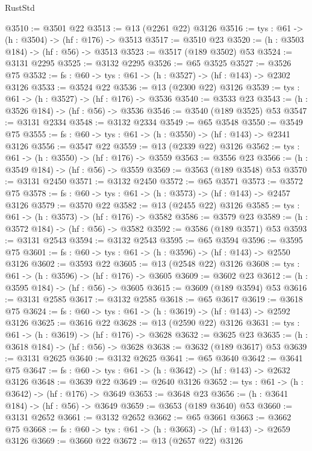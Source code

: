 \begin{lexlean}{RustStd}
\begin{coremodule}
@3510 := @3501 @22
@3513 := @13 (@2261 @22) @3126
@3516 := {tys : @61} -> (h : @3504) -> (hf : @176) -> @3513
@3517 := @3510 @23
@3520 := (h : @3503 @184) -> (hf : @56) -> @3513
@3523 := @3517 (@189 @3502) @53
@3524 := @3131 @2295
@3525 := @3132 @2295
@3526 := @65 @3525
@3527 := @3526 @75
@3532 := {fs : @60} -> {tys : @61} -> (h : @3527) -> (hf : @143) -> @2302 @3126
@3533 := @3524 @22
@3536 := @13 (@2300 @22) @3126
@3539 := {tys : @61} -> (h : @3527) -> (hf : @176) -> @3536
@3540 := @3533 @23
@3543 := (h : @3526 @184) -> (hf : @56) -> @3536
@3546 := @3540 (@189 @3525) @53
@3547 := @3131 @2334
@3548 := @3132 @2334
@3549 := @65 @3548
@3550 := @3549 @75
@3555 := {fs : @60} -> {tys : @61} -> (h : @3550) -> (hf : @143) -> @2341 @3126
@3556 := @3547 @22
@3559 := @13 (@2339 @22) @3126
@3562 := {tys : @61} -> (h : @3550) -> (hf : @176) -> @3559
@3563 := @3556 @23
@3566 := (h : @3549 @184) -> (hf : @56) -> @3559
@3569 := @3563 (@189 @3548) @53
@3570 := @3131 @2450
@3571 := @3132 @2450
@3572 := @65 @3571
@3573 := @3572 @75
@3578 := {fs : @60} -> {tys : @61} -> (h : @3573) -> (hf : @143) -> @2457 @3126
@3579 := @3570 @22
@3582 := @13 (@2455 @22) @3126
@3585 := {tys : @61} -> (h : @3573) -> (hf : @176) -> @3582
@3586 := @3579 @23
@3589 := (h : @3572 @184) -> (hf : @56) -> @3582
@3592 := @3586 (@189 @3571) @53
@3593 := @3131 @2543
@3594 := @3132 @2543
@3595 := @65 @3594
@3596 := @3595 @75
@3601 := {fs : @60} -> {tys : @61} -> (h : @3596) -> (hf : @143) -> @2550 @3126
@3602 := @3593 @22
@3605 := @13 (@2548 @22) @3126
@3608 := {tys : @61} -> (h : @3596) -> (hf : @176) -> @3605
@3609 := @3602 @23
@3612 := (h : @3595 @184) -> (hf : @56) -> @3605
@3615 := @3609 (@189 @3594) @53
@3616 := @3131 @2585
@3617 := @3132 @2585
@3618 := @65 @3617
@3619 := @3618 @75
@3624 := {fs : @60} -> {tys : @61} -> (h : @3619) -> (hf : @143) -> @2592 @3126
@3625 := @3616 @22
@3628 := @13 (@2590 @22) @3126
@3631 := {tys : @61} -> (h : @3619) -> (hf : @176) -> @3628
@3632 := @3625 @23
@3635 := (h : @3618 @184) -> (hf : @56) -> @3628
@3638 := @3632 (@189 @3617) @53
@3639 := @3131 @2625
@3640 := @3132 @2625
@3641 := @65 @3640
@3642 := @3641 @75
@3647 := {fs : @60} -> {tys : @61} -> (h : @3642) -> (hf : @143) -> @2632 @3126
@3648 := @3639 @22
@3649 := @2640 @3126
@3652 := {tys : @61} -> (h : @3642) -> (hf : @176) -> @3649
@3653 := @3648 @23
@3656 := (h : @3641 @184) -> (hf : @56) -> @3649
@3659 := @3653 (@189 @3640) @53
@3660 := @3131 @2652
@3661 := @3132 @2652
@3662 := @65 @3661
@3663 := @3662 @75
@3668 := {fs : @60} -> {tys : @61} -> (h : @3663) -> (hf : @143) -> @2659 @3126
@3669 := @3660 @22
@3672 := @13 (@2657 @22) @3126

\end{coremodule}
\end{lexlean}
